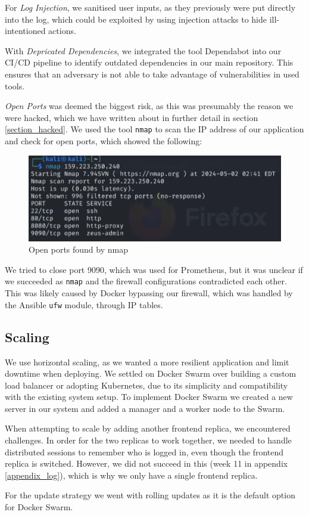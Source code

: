 For \textit{Log Injection}, we sanitised user inputs, as they previously were put directly into the log, which could be exploited by using injection attacks to hide ill-intentioned actions.

With \textit{Depricated Dependencies}, we integrated the tool Dependabot into our CI/CD pipeline to identify outdated dependencies in our main repository. This ensures that an adversary is not able to take advantage of vulnerabilities in used tools.

\textit{Open Ports} was deemed the biggest risk, as this was presumably the reason we were hacked, which we have written about in further detail in section \ref{section_hacked}. We used the tool \texttt{nmap} to scan the IP address of our application and check for open ports, which showed the following:
\begin{figure}[H]
    \centering
    \includegraphics[width=1\linewidth]{images/nmap.png}
    \caption{Open ports found by nmap}
    \label{fig:matrix}
\end{figure}
We tried to close port 9090, which was used for Prometheus, but it was unclear if we succeeded as \texttt{nmap} and the firewall configurations contradicted each other. This was likely caused by Docker bypassing our firewall, which was handled by the Ansible \texttt{ufw} module, through IP tables.

\subsection{Scaling}
We use horizontal scaling, as we wanted a more resilient application and limit downtime when deploying. We settled on Docker Swarm over building a custom load balancer or adopting Kubernetes, due to its simplicity and compatibility with the existing system setup. To implement Docker Swarm we created a new server in our system and added a manager and a worker node to the Swarm.

When attempting to scale by adding another frontend replica, we encountered challenges. In order for the two replicas to work together, we needed to handle distributed sessions to remember who is logged in, even though the frontend replica is switched. However, we did not succeed in this (week 11 in appendix \ref{appendix_log}), which is why we only have a single frontend replica.

For the update strategy we went with rolling updates as it is the default option for Docker Swarm.

